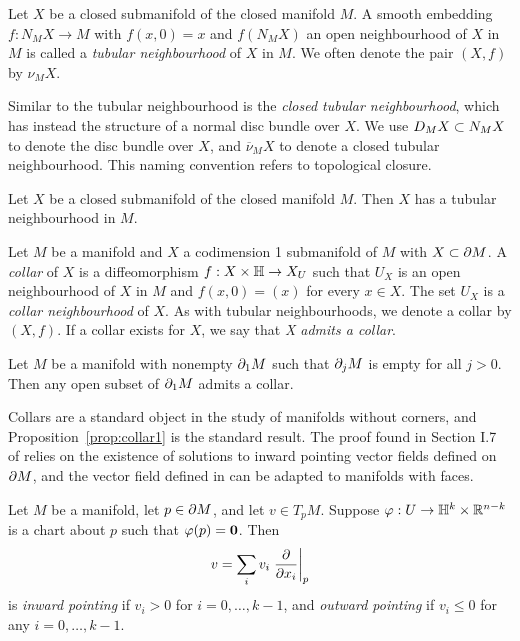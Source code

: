 \begin{defn}
	\label{def:tubularneighbourhood}
	Let $X$ be a closed submanifold of the closed manifold $M$.
	A smooth embedding $f:N_M X\to M$ with $f(x,0)=x$ and $f(N_M X)$ an open neighbourhood of $X$ in $M$ is called a \emph{tubular neighbourhood} of $X$ in $M$.
	We often denote the pair $(X,f)$ by $\nu_M X$.
\end{defn}

Similar to the tubular neighbourhood is the \emph{closed tubular neighbourhood}, which has instead the structure of a normal disc bundle over $X$.
We use $D_M X\subset N_M X$ to denote the disc bundle over $X$, and $\overline{\nu}_M X$ to denote a closed tubular neighbourhood.
This naming convention refers to topological closure.

\begin{theorem}
	\label{thm:tubularneighbourhood}
	Let $X$ be a closed submanifold of the closed manifold $M$.
	Then $X$ has a tubular neighbourhood in $M$.
\end{theorem}

\begin{defn}
	\label{defthm:collar}
	Let $M$ be a manifold and $X$ a codimension 1 submanifold of $M$ with $X\subset \partial M$.
	A \emph{collar} of $X$ is a diffeomorphism $f: X\times \mathbb{H}\to X_U$ such that $U_X$ is an open neighbourhood of $X$ in $M$ and $f(x,0)=(x)$ for every $x\in X$.
	The set $U_X$ is a \emph{collar neighbourhood} of $X$.
	As with tubular neighbourhoods, we denote a collar by $(X,f)$.
	If a collar exists for $X$, we say that \emph{X admits a collar}.
\end{defn}

\begin{prop}
	\label{prop:collar1}
	Let $M$ be a manifold with nonempty $\partial_1 M$ such that $\partial_j M$ is empty for all $j>0$.
	Then any open subset of $\partial_1 M$ admits a collar.
\end{prop}

Collars are a standard object in the study of manifolds without corners, and Proposition~\ref{prop:collar1} is the standard result.
The proof found in Section I.7 of \cite{Kosi93} relies on the existence of solutions to inward pointing vector fields defined on $\partial M$, and the vector field defined in \cite{Kosi93} can be adapted to manifolds with faces.

\begin{defn}
	Let $M$ be a manifold, let $p\in \partial M$, and let $v\in T_p M$.
	Suppose $\varphi:U\to\mathbb{H}^k\times\mathbb{R}^{n-k}$ is a chart about $p$ such that $\varphi(p)={\bf 0}$.
	Then $$v=\sum_{i}v_i\left.\frac{\partial}{\partial x_i}\right|_{p}$$ is \emph{inward pointing} if $v_i>0$ for $i=0,\dots,k-1$, and \emph{outward pointing} if $v_i\leq 0$ for any $i=0,\dots,k-1$.
\end{defn}

